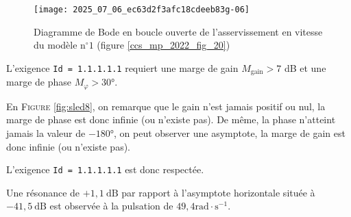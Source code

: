 \begin{figure}[!h]
\centering
\texttt{[image: 2025\_07\_06\_ec63d2f3afc18cdeeb83g-06]}
\caption{\label{ccs_mp_2022_fig_08}Diagramme de Bode en boucle ouverte de l'asservissement en vitesse du modèle $\mathrm{n}^{\circ} 1$ (figure \ref{ccs_mp_2022_fig_20})}
\end{figure}
\fi


\ifprof
\begin{corrige}
L'exigence \texttt{Id = 1.1.1.1.1} requiert une marge de gain $M_\text{gain} > 7$ dB et une marge de phase $M_\varphi > 30$°.

En \textsc{Figure} \ref{fig:sled8}, on remarque que le gain n'est jamais positif ou nul, la marge de phase est donc infinie (ou n'existe pas). De même, la phase n'atteint jamais la valeur de $-180$°, on peut observer une asymptote, la marge de gain est donc infinie (ou n'existe pas).

L'exigence \texttt{Id = 1.1.1.1.1} est donc respectée. 
\end{corrige}
\else
\fi


Une résonance de $+1,1 \mathrm{~dB}$ par rapport à l'asymptote horizontale située à $-41,5 \mathrm{~dB}$ est observée à la pulsation de $49,4 \mathrm{rad} \cdot \mathrm{s}^{-1}$.

